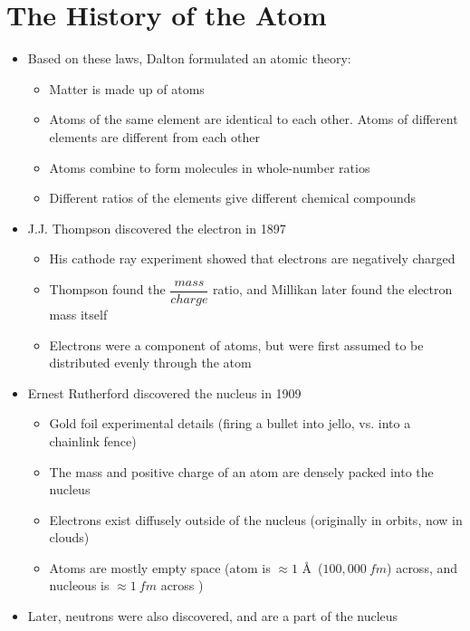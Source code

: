 \documentclass[12pt, openany, letterpaper]{memoir}
\begin{document}
\section{The History of the Atom}
\begin{itemize}
	\item Based on these laws, Dalton formulated an atomic theory:
	      \begin{itemize}
		      \item Matter is made up of atoms
		      \item Atoms of the same element are identical to each other. Atoms of different elements are different from each other
		      \item Atoms combine to form molecules in whole-number ratios
		      \item Different ratios of the elements give different chemical compounds
	      \end{itemize}
	\item J.J. Thompson discovered the electron in 1897
	      \begin{itemize}
		      \item His cathode ray experiment showed that electrons are negatively charged
		      \item Thompson found the $\dfrac{mass}{charge}$ ratio, and Millikan later found the electron mass itself
		      \item Electrons were a component of atoms, but were first assumed to be distributed evenly through the atom
	      \end{itemize}
	\item Ernest Rutherford discovered the nucleus in 1909
	      \begin{itemize}
		      \item Gold foil experimental details (firing a bullet into jello, vs. into a chainlink fence)
		      \item The mass and positive charge of an atom are densely packed into the nucleus
		      \item Electrons exist diffusely outside of the nucleus (originally in orbits, now in clouds)
		      \item Atoms are mostly empty space (atom is $\approx 1$ \AA ~($100,000~fm$) across, and nucleous is $\approx 1~fm$ across )
	      \end{itemize}
	\item Later, neutrons were also discovered, and are a part of the nucleus
\end{itemize}
\end{document}

